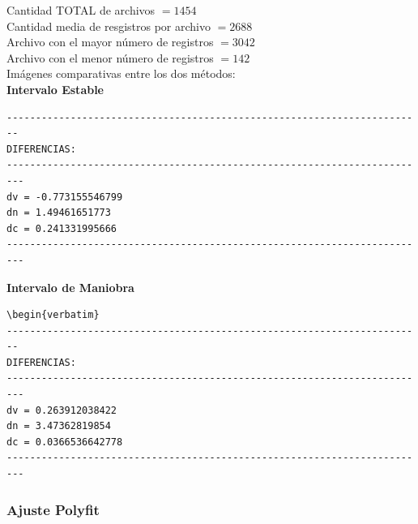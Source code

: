 \noindent
Cantidad TOTAL de archivos $=  1454$\\
Cantidad media de resgistros por archivo $=  2688$\\
Archivo con el mayor n\'umero de registros $=  3042$\\
Archivo con el menor n\'umero de registros $=  142$\\

Im\'agenes comparativas entre los dos m\'etodos:\\
{\bf{Intervalo Estable}}\\

\begin{verbatim}
------------------------------------------------------------------------
DIFERENCIAS:
-------------------------------------------------------------------------
dv = -0.773155546799
dn = 1.49461651773
dc = 0.241331995666
-------------------------------------------------------------------------
\end{verbatim}

{\bf{Intervalo de Maniobra}}


\begin{verbatim}
\begin{verbatim}
------------------------------------------------------------------------
DIFERENCIAS:
-------------------------------------------------------------------------
dv = 0.263912038422
dn = 3.47362819854
dc = 0.0366536642778
-------------------------------------------------------------------------
\end{verbatim}

\subsubsection*{Ajuste Polyfit}

